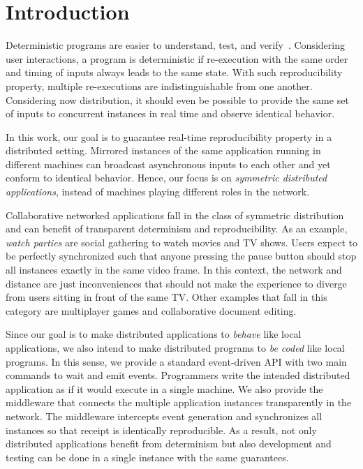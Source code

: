 \documentclass[sigplan,screen]{acmart}
\begin{document}
\section{Introduction}

Deterministic programs are easier to understand, test, and verify~\cite{det}.
Considering user interactions, a program is deterministic if re-execution with
the same order and timing of inputs always leads to the same state.
With such reproducibility property, multiple re-executions are
indistinguishable from one another.
Considering now distribution, it should even be possible to provide the same
set of inputs to concurrent instances in real time and observe identical
behavior.

In this work, our goal is to guarantee real-time reproducibility property in a
distributed setting.
Mirrored instances of the same application running in different machines can
broadcast asynchronous inputs to each other and yet conform to
identical behavior.
Hence, our focus is on \emph{symmetric distributed applications}, instead of
machines playing different roles in the network.

Collaborative networked applications fall in the class of symmetric
distribution and can benefit of transparent determinism and reproducibility.
As an example, \emph{watch parties} are social gathering to watch movies and TV
shows.
Users expect to be perfectly synchronized such that anyone pressing the pause
button should stop all instances exactly in the same video frame.
In this context, the network and distance are just inconveniences that should
not make the experience to diverge from users sitting in front of the same TV.
Other examples that fall in this category are multiplayer games and
collaborative document editing.

Since our goal is to make distributed applications to \emph{behave} like local
applications, we also intend to make distributed programs to \emph{be coded}
like local programs.
In this sense, we provide a standard event-driven API with two main commands
to wait and emit events.
Programmers write the intended distributed application as if it would execute
in a single machine.
We also provide the middleware that connects the multiple application instances
transparently in the network.
The middleware intercepts event generation and synchronizes all instances so
that receipt is identically reproducible.
As a result, not only distributed applications benefit from determinism but
also development and testing can be done in a single instance with the same
guarantees.
\end{document}
